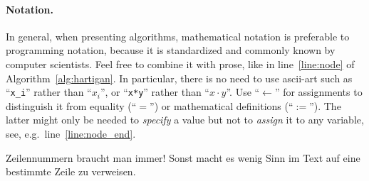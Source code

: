 \documentclass[main.tex]{subfiles}
\begin{document}
\paragraph{Notation.} In general, when presenting algorithms, mathematical notation is preferable to programming notation, because it is standardized and commonly known by computer scientists. Feel free to combine it with prose, like in line~\ref{line:node} of Algorithm~\ref{alg:hartigan}. In particular, there is no need to use ascii-art such as ``\verb|x_i|'' rather than ``$x_i$'', or ``\verb|x*y|'' rather than ``$x\cdot y$''. Use ``$\leftarrow$'' for assignments to distinguish it from equality (``$=$'') or mathematical definitions (``$:=$''). The latter might only be needed to \emph{specify} a value but not to \emph{assign} it to any variable, see, e.g.\ line~\ref{line:node_end}.

\begin{tipp}[title=Tipp]
Zeilennummern braucht man immer! Sonst macht es wenig Sinn im Text auf eine bestimmte Zeile zu verweisen. 
\end{tipp}
\begin{algorithm}[ht]\DontPrintSemicolon%
 \caption{Fitch-Hartigan for Zero-One Instances}
 \label{alg:hartigan}
 

\end{algorithm}
\end{document}
